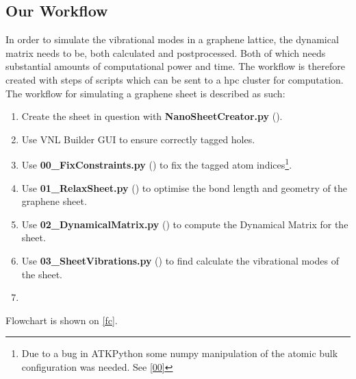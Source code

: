 
\subsection{Our Workflow}
In order to simulate the vibrational modes in a graphene lattice, the dynamical matrix needs to be, both calculated and postprocessed. Both of which needs substantial amounts of computational power and time. The workflow is therefore created with steps of scripts which can be sent to a hpc cluster for computation.
The workflow for simulating a graphene sheet is described as such:
\begin{enumerate}
  \item Create the sheet in question with \textbf{NanoSheetCreator.py} ().
  \item Use VNL Builder GUI to ensure correctly tagged holes.
  \item Use \textbf{00\_FixConstraints.py} () to fix the tagged atom indices\footnote{Due to a bug in ATKPython some numpy manipulation of the atomic bulk configuration was needed. See \cref{00}}.
  \item Use \textbf{01\_RelaxSheet.py} () to optimise the bond length and geometry of the graphene sheet.
  \item Use \textbf{02\_DynamicalMatrix.py} () to compute the Dynamical Matrix for the sheet.
  \item Use \textbf{03\_SheetVibrations.py} () to find calculate the vibrational modes of the sheet.
  \item {}
\end{enumerate}
Flowchart is shown on \cref{fc}.
